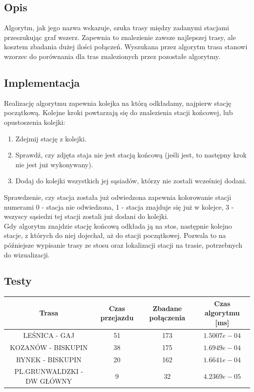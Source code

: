 \documentclass[13pt]{article}
\begin{document}
\subsection{Opis}
Algorytm, jak jego nazwa wskazuje, szuka trasy między zadanymi stacjami przeszukując graf wszerz. Zapewnia to znalezienie zawsze najlepszej trasy, ale kosztem zbadania dużej ilości połączeń. Wyszukana przez algorytm trasa stanowi wzorzec do porównania dla tras znalezionych przez pozostałe algorytmy.

\newpage
\subsection{Implementacja}

Realizację algorytmu zapewnia kolejka na którą odkładamy, najpierw stację początkową. Kolejne kroki powtarzają się do znalezienia stacji końcowej, lub opustoszenia kolejki: 
\begin{enumerate}
\item Zdejmij stację z kolejki.
\item Sprawdź, czy zdjęta staja nie jest stacją końcową (jeśli jest, to następny krok nie jest już wykonywany).
\item Dodaj do kolejki wszystkich jej sąsiadów, którzy nie zostali wcześniej dodani.
\end{enumerate}
Sprawdzenie, czy stacja została już odwiedzona zapewnia kolorowanie stacji numerami 0 - stacja nie odwiedzona, 1 - stacja znajduje się już w kolejce, 3 - wszyscy sąsiedzi tej stacji zostali już dodani do kolejki. \\
Gdy algorytm znajdzie stację końcową odkłada ją na stos, następnie kolejno stacje, z których do niej dojechał, aż do stacji początkowej. Pozwala to na późniejsze wypisanie trasy ze stosu oraz lokalizacji stacji na trasie, potrzebnych do wizualizacji.


\subsection{Testy}
\begin{tabular}{|c|c|c|c|} \hline
Trasa & Czas przejazdu  & Zbadane połączenia & Czas algorytmu [ms]\\
\hline \hline
 LEŚNICA - GAJ & 51 & 173 & $1.5007e-04$ \\
 \hline
 KOZANÓW - BISKUPIN & 38 & 175 &  $1.6949e-04$ \\
 \hline
 RYNEK - BISKUPIN & 20 & 162 & $1.6641e-04$ \\
 \hline
 PL.GRUNWALDZKI - DW GŁÓWNY & 9 & 32 &  $4.2369e-05$\\
 \hline
\end{tabular}
\end{document}
